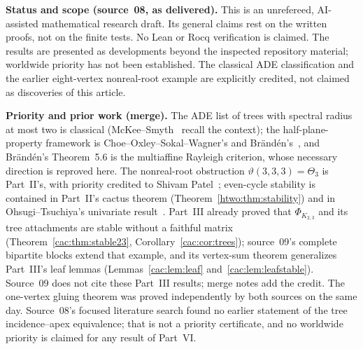 \documentclass[11pt]{article}
\numberwithin{equation}{section}
\theoremstyle{definition}
\begin{document}
\begin{statusbox}
\small\textbf{Status and scope (source~08, as delivered).}
This is an unrefereed, AI-assisted mathematical
research draft.  Its general claims rest on the written proofs, not on the
finite tests.  No Lean or Rocq verification is claimed.  The results are
presented as developments beyond the inspected repository material;
worldwide priority has not been established.  The classical ADE
classification and the earlier eight-vertex nonreal-root example are
explicitly credited, not claimed as discoveries of this article.
\end{statusbox}

\begin{statusbox}
\small\textbf{Priority and prior work (merge).} The ADE list of trees with
spectral radius at most two is classical (McKee--Smyth~\cite{McKeeSmyth}
recall the context); the half-plane-property framework is Choe--Oxley--Sokal--Wagner's
and Br\"and\'en's~\cite{COSW,Branden}, and Br\"and\'en's Theorem~5.6 is the
multiaffine Rayleigh criterion, whose necessary direction is reproved here.
The nonreal-root obstruction $\vartheta(3,3,3)=\Theta_3$ is Part~II's, with
priority credited to Shivam Patel~\cite{Patel}; even-cycle stability is
contained in Part~II's cactus theorem (Theorem~\ref{htwo:thm:stability}) and
in Ohsugi--Tsuchiya's univariate result~\cite{OT21}. Part~III already proved
that $\Phi_{K_{2,3}}$ and its tree attachments are stable without a faithful
matrix (Theorem~\ref{cac:thm:stable23}, Corollary~\ref{cac:cor:trees}); source~09's
complete bipartite blocks extend that example, and its vertex-sum theorem
generalizes Part~III's leaf lemmas (Lemmas~\ref{cac:lem:leaf}
and~\ref{cac:lem:leafstable}). Source~09 does not cite these Part~III
results; merge notes add the credit. The one-vertex gluing theorem was
proved independently by both sources on the same day. Source~08's focused
literature search found no earlier statement of the tree incidence--apex
equivalence; that is not a priority certificate, and no worldwide priority
is claimed for any result of Part~VI.
\end{statusbox}
\end{document}
